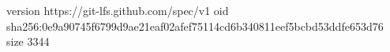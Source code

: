 version https://git-lfs.github.com/spec/v1
oid sha256:0e9a90745f6799d9ae21eaf02afef75114cd6b340811eef5bcbd53ddfe653d76
size 3344
